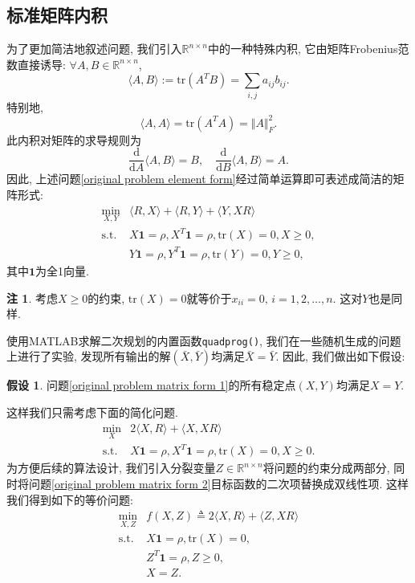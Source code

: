 \documentclass[UTF8,10.5pt,a4paper]{ctexart}
\theoremstyle{definition}
\newtheorem{assume}{假设\hspace{0.05pt}}
\theoremstyle{definition}
\newtheorem{rem}{注\hspace{0.05pt}}
\newcommand{\trace}{\mathrm{tr}}
\newcommand{\st}{\mathrm{s.t.}}
\newcommand{\one}{\mathbf{1}}
\begin{document}
\subsection{标准矩阵内积}
为了更加简洁地叙述问题, 我们引入$\mathbb{R}^{n\times n}$中的一种特殊内积, 它由矩阵Frobenius范数直接诱导: $\forall A,B\in\mathbb{R}^{n\times n}$,
	$$\langle A,B\rangle:=\trace(A^TB)=\sum\limits_{i,j}a_{ij}b_{ij}.$$
	特别地, 
	$$\langle A,A\rangle=\trace(A^TA)=\Vert A\Vert_F^2.$$
	此内积对矩阵的求导规则为
	$$\frac{\mathrm d}{\mathrm dA}\langle A,B\rangle=B,\quad\frac{\mathrm d}{\mathrm dB}\langle A,B\rangle=A.$$
	因此, 上述问题\eqref{original problem element form}经过简单运算即可表述成简洁的矩阵形式:
	\begin{equation}
	\begin{array}{rl}
	\min\limits_{X,Y} & \langle R,X\rangle+\langle R, Y\rangle+\langle Y,XR\rangle\\
	\st & X\one=\rho,X^T\one=\rho,\trace(X)=0,X\ge0,\\
	& Y\one=\rho,Y^T\one=\rho,\trace(Y)=0,Y\ge0,
	\end{array}
	\label{original problem matrix form 1}
	\end{equation}
	其中$\one$为全1向量. 
	\begin{rem}
		考虑$X\ge0$的约束, $\trace(X)=0$就等价于$x_{ii}=0,\,i=1,2,\ldots,n$. 这对$Y$也是同样. 
	\end{rem}
	使用MATLAB求解二次规划的内置函数\texttt{quadprog()}, 我们在一些随机生成的问题上进行了实验, 发现所有输出的解$(\bar X,\bar Y)$均满足$\bar X=\bar Y$. 因此, 我们做出如下假设:
	\begin{assume}\label{assume}
		问题\eqref{original problem matrix form 1}的所有稳定点$(X,Y)$均满足$X=Y$.
	\end{assume}
	这样我们只需考虑下面的简化问题.
	\begin{equation}
		\begin{array}{rl}
			\min\limits_{X} & 2\langle X,R\rangle+\langle X,XR\rangle\\
			\st & X\one=\rho,X^T\one=\rho,\trace(X)=0,X\ge0.
		\end{array}
		\label{original problem matrix form 2}
	\end{equation}
	为方便后续的算法设计, 我们引入分裂变量$Z\in\mathbb{R}^{n\times n}$将问题的约束分成两部分, 同时将问题\eqref{original problem matrix form 2}目标函数的二次项替换成双线性项. 这样我们得到如下的等价问题:
	\begin{equation}
		\begin{array}{rl}
			\min\limits_{X,Z} & f(X,Z)\triangleq2\langle X,R\rangle+\langle Z,XR\rangle\\
			\st & X\one=\rho,\trace(X)=0,\\
			& Z^T\one=\rho,Z\ge0,\\
			& X=Z.
		\end{array}
		\label{original problem matrix form}
	\end{equation}
	
\end{document}
